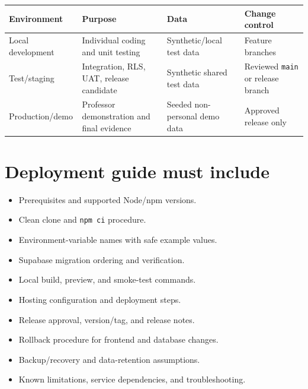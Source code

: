 \documentclass[
  10pt,
  a4paper,
  oneside]{report}
\newcounter{none} %
\providecommand{\tightlist}{%
  \setlength{\itemsep}{0pt}\setlength{\parskip}{0pt}}
\begin{document}
{\def\LTcaptype{none} %
\begin{longtable}[]{@{}
  >{\raggedright\arraybackslash}p{}
  >{\raggedright\arraybackslash}p{}
  >{\raggedright\arraybackslash}p{}
  >{\raggedright\arraybackslash}p{}@{}}
\toprule\noalign{}
\begin{minipage}[b]{\linewidth}\raggedright
Environment
\end{minipage} & \begin{minipage}[b]{\linewidth}\raggedright
Purpose
\end{minipage} & \begin{minipage}[b]{\linewidth}\raggedright
Data
\end{minipage} & \begin{minipage}[b]{\linewidth}\raggedright
Change control
\end{minipage} \\
\midrule\noalign{}
\endhead
\bottomrule\noalign{}
\endlastfoot
Local development & Individual coding and unit testing & Synthetic/local
test data & Feature branches \\
Test/staging & Integration, RLS, UAT, release candidate & Synthetic
shared test data & Reviewed \texttt{main} or release branch \\
Production/demo & Professor demonstration and final evidence & Seeded
non-personal demo data & Approved release only \\
\end{longtable}
}

\section{Deployment guide must
include}\label{222-deployment-guide-must-include}

\begin{itemize}
\tightlist
\item
  Prerequisites and supported Node/npm versions.
\item
  Clean clone and \texttt{npm\ ci} procedure.
\item
  Environment-variable names with safe example values.
\item
  Supabase migration ordering and verification.
\item
  Local build, preview, and smoke-test commands.
\item
  Hosting configuration and deployment steps.
\item
  Release approval, version/tag, and release notes.
\item
  Rollback procedure for frontend and database changes.
\item
  Backup/recovery and data-retention assumptions.
\item
  Known limitations, service dependencies, and troubleshooting.
\end{itemize}
\end{document}
